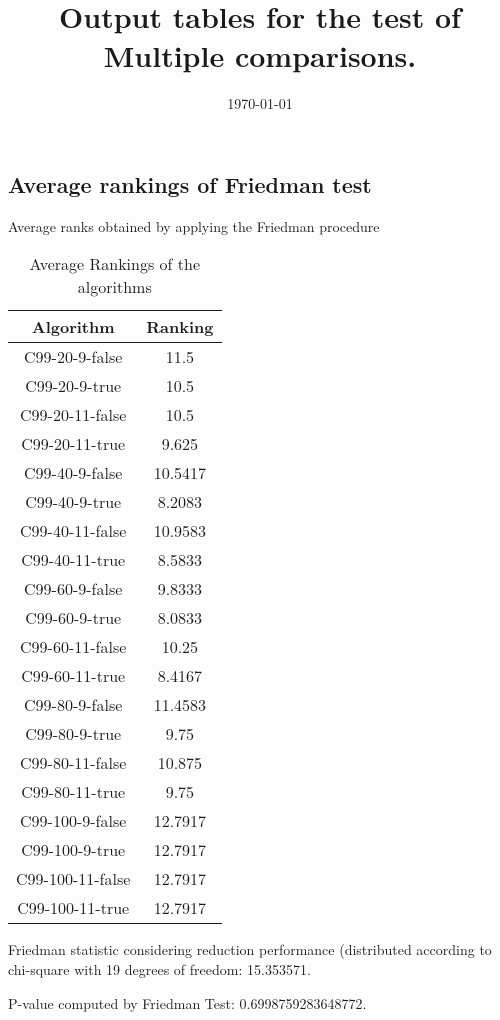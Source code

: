 \documentclass[a4paper,10pt]{article}
\title{Output tables for the test of Multiple comparisons.}
\author{}
\date{\today}
\begin{document}
\begin{landscape}
\pagestyle{empty}
\maketitle
\thispagestyle{empty}
\section{Average rankings of Friedman test}



Average ranks obtained by applying the Friedman procedure

\begin{table}[!htp]
\centering
\begin{tabular}{|c|c|}\hline
Algorithm&Ranking\\\hline
C99-20-9-false & 11.5\\
C99-20-9-true & 10.5\\
C99-20-11-false & 10.5\\
C99-20-11-true & 9.625\\
C99-40-9-false & 10.5417\\
C99-40-9-true & 8.2083\\
C99-40-11-false & 10.9583\\
C99-40-11-true & 8.5833\\
C99-60-9-false & 9.8333\\
C99-60-9-true & 8.0833\\
C99-60-11-false & 10.25\\
C99-60-11-true & 8.4167\\
C99-80-9-false & 11.4583\\
C99-80-9-true & 9.75\\
C99-80-11-false & 10.875\\
C99-80-11-true & 9.75\\
C99-100-9-false & 12.7917\\
C99-100-9-true & 12.7917\\
C99-100-11-false & 12.7917\\
C99-100-11-true & 12.7917\\
\hline
\end{tabular}
\caption{Average Rankings of the algorithms}
\end{table}

Friedman statistic considering reduction performance (distributed according to chi-square with 19 degrees of freedom: 15.353571.

P-value computed by Friedman Test: 0.6998759283648772.\newline




\end{landscape}
\end{document}
